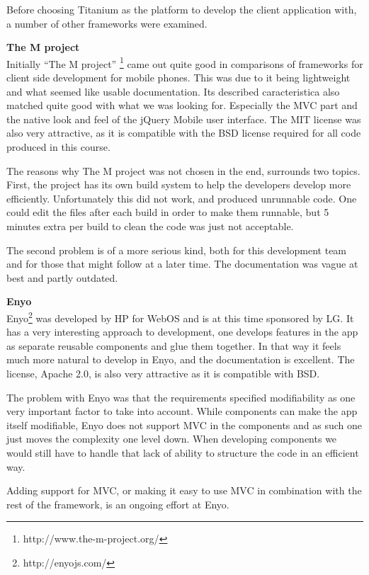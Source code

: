 \documentclass[11pt]{book}
\begin{document}
Before choosing Titanium as the platform to develop the client application with, a number of other frameworks were examined.

\textbf{The M project}\\
Initially “The M project” \footnote{http://www.the-m-project.org/} came out quite good in comparisons of frameworks for client side development for mobile phones. This was due to it being lightweight and what seemed like usable documentation. Its described caracteristica also matched quite good with what we was looking for. Especially the MVC part and the native look and feel of the jQuery Mobile user interface. The MIT license was also very attractive, as it is compatible with the BSD license required for all code produced in this course.

The reasons why The M project was not chosen in the end, surrounds two topics. First, the project has its own build system to help the developers develop more efficiently. Unfortunately this did not work, and produced unrunnable code. One could edit the files after each build in order to make them runnable, but 5 minutes extra per build to clean the code was just not acceptable.

The second problem is of a more serious kind, both for this development team and for those that might follow at a later time. The documentation was vague at best and partly outdated.

\textbf{Enyo}\\
Enyo\footnote{http://enyojs.com/} was developed by HP for WebOS\cite{enyoHistory} and is at this time sponsored by LG. It has a very interesting approach to development, one develops features in the app as separate reusable components and glue them together. In that way it feels much more natural to develop in Enyo, and the documentation is excellent. The license, Apache 2.0, is also very attractive as it is compatible with BSD.

The problem with Enyo was that the requirements specified modifiability as one very important factor to take into account. While components can make the app itself modifiable, Enyo does not support MVC in the components and as such one just moves the complexity one level down. When developing components we would still have to handle that lack of ability to structure the code in an efficient way.

Adding support for MVC, or making it easy to use MVC in combination with the rest of the framework, is an ongoing effort at Enyo.
\end{document}
